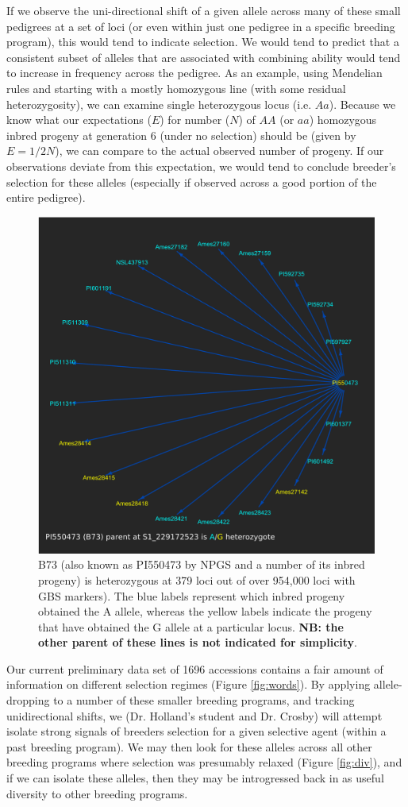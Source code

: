 \documentclass[12pt]{article}
\begin{document}
{If we observe the uni-directional shift of a given allele across many of these small pedigrees at a set of loci (or even within just one pedigree in a specific breeding program), this would tend to indicate selection. 
We would tend to predict that a consistent subset of alleles that are associated with combining ability would tend to increase in frequency across the pedigree.
As an example, using Mendelian rules and starting with a mostly homozygous line (with some residual heterozygosity), we can examine single heterozygous locus (i.e. $Aa$). 
Because we know what our expectations ($E$) for number ($N$) of $AA$ (or $aa$) homozygous inbred progeny at generation 6 (under no selection) should be (given by $E = 1/2 N$), we can compare to the actual observed number of progeny. 
If our observations deviate from this expectation, we would tend to conclude breeder's selection for these alleles (especially if observed across a good portion of the entire pedigree). 

\begin{figure}
\includegraphics[width=0.5\linewidth]{Pruned.pdf}
\caption{B73 (also known as PI550473 by NPGS and a number of its inbred progeny) is heterozygous at 379 loci out of over 954,000 loci with GBS markers). The blue labels represent which inbred progeny obtained the A allele, whereas the yellow labels indicate the progeny that have obtained the G allele at a particular locus. \textbf{NB: the other parent of these lines is not indicated for simplicity}.}
\label{fig:alleledrop}
\end{figure}

Our current preliminary data set of 1696 accessions contains a fair amount of information on different selection regimes (Figure \ref{fig:words}). 
By applying allele-dropping to a number of these smaller breeding programs, and tracking unidirectional shifts, we (Dr. Holland's student and Dr. Crosby) will attempt isolate strong signals of breeders selection for a given selective agent (within a past breeding program). 
We may then look for these alleles across all other breeding programs where selection was presumably relaxed (Figure \ref{fig:div}), and if we can isolate these alleles, then they may be introgressed back in as useful diversity to other breeding programs.

}
\end{document}
